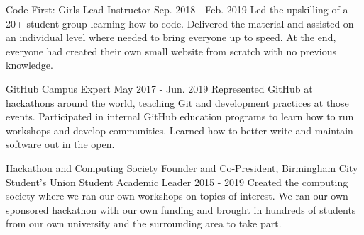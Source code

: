 

\begin{cventries}

  \cventry
    {Code First: Girls}
    {Lead Instructor}
    {}
    {Sep. 2018 - Feb. 2019}
    {Led the upskilling of a 20+ student group learning how to code. Delivered the material and assisted on an individual level where needed to bring everyone up to speed. At the end, everyone had created their own small website from scratch with no previous knowledge.}

  \cventry
    {GitHub}
    {Campus Expert}
    {}
    {May 2017 - Jun. 2019}
    {Represented GitHub at hackathons around the world, teaching Git and development practices at those events. Participated in internal GitHub education programs to learn how to run workshops and develop communities. Learned how to better write and maintain software out in the open.}

  \cventry
    {Hackathon and Computing Society Founder and Co-President, Birmingham City Student's Union}
    {Student Academic Leader}
    {}
    {2015 - 2019}
    {Created the computing society where we ran our own workshops on topics of interest. We ran our own sponsored hackathon with our own funding and brought in hundreds of students from our own university and the surrounding area to take part.}

\end{cventries}
